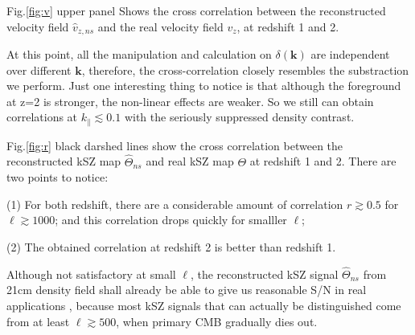 Fig.\ref{fig:v} upper panel Shows the cross correlation between 
the reconstructed velocity field $\hat v_{z,ns}$ and the real velocity field $v_z$, at redshift 1 and 2. 

At this point, all the manipulation and calculation on $\delta(\bm{k})$ are independent over different $\bm{k}$, 
therefore, the cross-correlation closely resembles the substraction we perform. 
Just one interesting thing to notice is that although the foreground at z=2 is stronger, 
the non-linear effects are weaker.  
So we still can obtain correlations at $k_\parallel \lesssim 0.1$ with the seriously suppressed density contrast. 

Fig.\ref{fig:r} black darshed lines show the cross correlation between the reconstructed kSZ map 
$\hat\Theta_{ns}$ and real kSZ map $\Theta$ at redshift 1 and 2.  
There are two points to notice: 

(1) For both redshift, there are a considerable amount of correlation 
$r\gtrsim0.5$ for $\ell \gtrsim 1000$; 
and this correlation drops quickly for smalller $\ell$; 

(2) The obtained correlation at redshift 2 is better than redshift 1.

Although not satisfactory at small $\ell$, the reconstructed kSZ signal $\hat \Theta_{ns}$ 
from 21cm density field shall already be able to give us reasonable S/N in real applications  
, because most kSZ signals that can actually be distinguished come from at least $\ell \gtrsim 500$, when primary CMB gradually dies out. 



